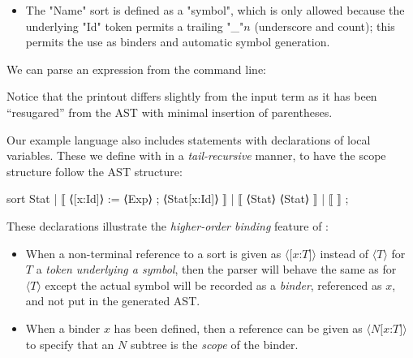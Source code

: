\documentclass[11pt]{article} %
\begin{document}
\begin{example}
\begin{itemize}
  \item The "Name" sort is defined as a "symbol", which is only allowed because the underlying "Id"
    token permits a trailing "_"$n$ (underscore and count); this permits the use as binders and
    automatic symbol generation.

  \end{itemize}
\end{example}

\begin{commands}
  We can parse an expression from the command line:
  Notice that the printout differs slightly from the input term as it has been ``resugared'' from
  the AST with minimal insertion of parentheses.
\end{commands}

\begin{example}\label{ex:syntax}
  Our example language also includes statements with declarations of local variables.  These we
  define with \HAX in a \emph{tail-recursive} manner, to have the scope structure follow the AST
  structure:
\begin{code}
sort Stat  | ⟦ ⟨[x:Id]⟩ := ⟨Exp⟩ ; ⟨Stat[x:Id]⟩ ⟧
           | ⟦ { ⟨Stat⟩ } ⟨Stat⟩ ⟧
           | ⟦ ⟧ ;
\end{code}
  These declarations illustrate the \emph{higher-order binding} feature of \HAX:
  \begin{itemize}

  \item When a non-terminal reference to a sort is given as $⟨\texttt{[}x\texttt{:}T\texttt{]}⟩$
    instead of $⟨T⟩$ for $T$ a \emph{token underlying a symbol}, then the parser will behave the
    same as for $⟨T⟩$ except the actual symbol will be recorded as a \emph{binder}, referenced as
    $x$, and not put in the generated AST.

  \item When a binder $x$ has been defined, then a reference can be given as
    $⟨N\texttt{[}x\texttt{:}T\texttt{]}⟩$ to specify that an $N$ subtree is the \emph{scope} of
    the binder.

  \end{itemize}
\end{example}
\end{document}
